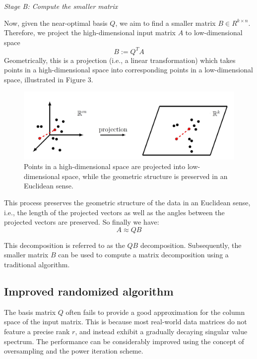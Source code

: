 \documentclass[a4paper,10pt]{article}
\begin{document}
\textit{Stage B: Compute the smaller matrix}

Now, given the near-optimal basis $Q$, we aim to find a smaller matrix $B \in R^{k \times n}$. Therefore, we project the high-dimensional input matrix $A$ to low-dimensional space 
\begin{equation}
B:= Q^T A
\end{equation}
Geometrically, this is a projection (i.e., a linear transformation) which takes points in a high-dimensional space into corresponding points in a low-dimensional space, illustrated in Figure 3.

\begin{figure}
	\includegraphics[scale=0.25]{fig3.jpg}
	\caption{Points in a high-dimensional space are projected into low-dimensional space, while
		the geometric structure is preserved in an Euclidean sense.}
	\label{fig3}
\end{figure}


This process preserves the geometric structure of the data in an Euclidean sense, i.e., the length of the projected vectors as well as the angles between the projected vectors are preserved. So finally we have:
\begin{equation}
A \approx Q B
\end{equation}

This decomposition is referred to as the $QB$ decomposition. Subsequently, the smaller matrix $B$ can be used to compute a matrix decomposition using a traditional algorithm.


\subsection{Improved randomized algorithm}
The basis matrix $Q$ often fails to provide a good approximation for the column space of the input matrix. This is because most real-world data matrices do not feature a precise rank $r$, and instead exhibit a gradually decaying singular value spectrum. The performance can be considerably improved using the concept of oversampling and the power iteration scheme.\\
\end{document}
